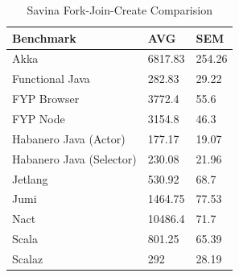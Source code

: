 \documentclass[oneside]{um-fict}
\begin{document}
\begin{table}[H]
    \begin{center}
        \begin{tabular}{|l|ll|}
        \hline
        Benchmark                & AVG & SEM \\ \hline
        Akka                     & 6817.83 & 254.26         \\
        Functional Java          & 282.83  & 29.22          \\
        FYP Browser              & 3772.4  & 55.6           \\
        FYP Node                 & 3154.8  & 46.3           \\
        Habanero Java (Actor)    & 177.17  & 19.07          \\
        Habanero Java (Selector) & 230.08  & 21.96          \\
        Jetlang                  & 530.92  & 68.7           \\
        Jumi                     & 1464.75 & 77.53          \\
        Nact                     & 10486.4 & 71.7           \\
        Scala                    & 801.25  & 65.39          \\
        Scalaz                   & 292     & 28.19          \\ \hline
        \end{tabular}
        \caption{Savina Fork-Join-Create Comparision}\label{tab:savinafjcreate}
    \end{center}
\end{table}
\end{document}
